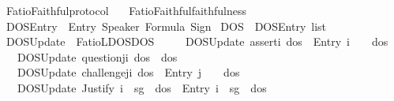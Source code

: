 %
\begin{isabellebody}%
%
%
\isadelimdocument
%
\endisadelimdocument
%
\isatagdocument
%
\isamarkuptrue%
%
\endisatagdocument
{\isafolddocument}%
%
\isadelimdocument
%
\endisadelimdocument
%
\isadelimtheory
%
\endisadelimtheory
%
\isatagtheory
{}\isamarkupfalse%
\ FatioFaithful{\isacharunderscore}{\kern0pt}protocol\isanewline
\ \ \ FatioFaithful{\isacharunderscore}{\kern0pt}faithfulness\isanewline
{}%
\endisatagtheory
{\isafoldtheory}%
%
\isadelimtheory
%
\endisadelimtheory
%
\isadelimdocument
%
\endisadelimdocument
%
\isatagdocument
%
\isamarkuptrue%
%
\endisatagdocument
{\isafolddocument}%
%
\isadelimdocument
%
\endisadelimdocument
{}\isamarkupfalse%
\ DOSEntry\ {\isacharequal}{\kern0pt}\ Entry\ Speaker\ Formula\ Sign\isanewline
{}\isamarkupfalse%
\ DOS\ {\isacharequal}{\kern0pt}\ {\isachardoublequoteopen}DOSEntry\ list{\isachardoublequoteclose}\isanewline
\isanewline
{}\isamarkupfalse%
\ DOSUpdate\ {\isacharcolon}{\kern0pt}{\isacharcolon}{\kern0pt}\ {\isachardoublequoteopen}FatioL{\isasymRightarrow}DOS{\isasymRightarrow}DOS{\isachardoublequoteclose}\ \isanewline
\ \ \ \ {\isachardoublequoteopen}DOSUpdate\ assert{\isacharbrackleft}{\kern0pt}i{\isacharcomma}{\kern0pt}{\isasymphi}{\isacharbrackright}{\kern0pt}\ dos\ {\isacharequal}{\kern0pt}\ {\isacharparenleft}{\kern0pt}Entry\ i\ {\isasymphi}\ {\isasymoplus}{\isacharparenright}{\kern0pt}\ {\isacharhash}{\kern0pt}\ dos{\isachardoublequoteclose}\isanewline
\ \ {\isacharbar}{\kern0pt}\ {\isachardoublequoteopen}DOSUpdate\ question{\isacharbrackleft}{\kern0pt}j{\isacharcomma}{\kern0pt}i{\isacharcomma}{\kern0pt}{\isasymphi}{\isacharbrackright}{\kern0pt}\ dos\ {\isacharequal}{\kern0pt}\ dos{\isachardoublequoteclose}\isanewline
\ \ {\isacharbar}{\kern0pt}\ {\isachardoublequoteopen}DOSUpdate\ challenge{\isacharbrackleft}{\kern0pt}j{\isacharcomma}{\kern0pt}i{\isacharcomma}{\kern0pt}{\isasymphi}{\isacharbrackright}{\kern0pt}\ dos\ {\isacharequal}{\kern0pt}\ {\isacharparenleft}{\kern0pt}Entry\ j\ {\isasymphi}\ {\isasymominus}{\isacharparenright}{\kern0pt}\ {\isacharhash}{\kern0pt}\ dos{\isachardoublequoteclose}\isanewline
\ \ {\isacharbar}{\kern0pt}\ {\isachardoublequoteopen}DOSUpdate\ {\isacharparenleft}{\kern0pt}Justify\ i\ {\isasymPhi}\ sg\ {\isasymphi}{\isacharparenright}{\kern0pt}\ dos\ {\isacharequal}{\kern0pt}\ {\isacharparenleft}{\kern0pt}Entry\ i\ {\isasymPhi}\ sg{\isacharparenright}{\kern0pt}\ {\isacharhash}{\kern0pt}\ dos{\isachardoublequoteclose}\isanewline

\end{isabellebody}

